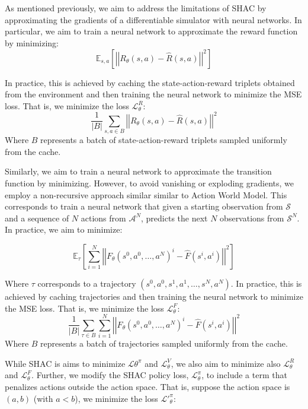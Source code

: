 \section{\fname{}}

As mentioned previously, we aim to address the limitations of SHAC by approximating the gradients of a differentiable simulator with neural networks. In particular, we aim to train a neural network to approximate the reward function by minimizing: 
$$ \mathbb{E}_{s,a}\left[\left|\left| R_{\theta}(s, a) - \hat{R}(s, a) \right|\right|^2\right] $$

In practice, this is achieved by caching the state-action-reward triplets obtained from the environment and then training the neural network to minimize the MSE loss. That is, we minimize the loss $\mathcal{L}_\theta^{R}$:
$$ \frac{1}{\left|B\right|}\sum_{s,a \in B}\left|\left| R_\theta(s, a) - \hat{R}(s, a) \right|\right|^2 $$
Where $B$ represents a batch of state-action-reward triplets sampled uniformly from the cache.

Similarly, we aim to train a neural network to approximate the transition function by minimizing. However, to avoid vanishing or exploding gradients, we employ a non-recursive approach similar similar to Action World Model\cite{Ma24}. This corresponds to train a neural network that given a starting observation from $\mathcal{S}$ and a sequence of $N$ actions from $\mathcal{A}^N$, predicts the next $N$ observations from $\mathcal{S}^N$. In practice, we aim to minimize:

$$ \mathbb{E}_{\tau}\left[\sum_{i=1}^N \left|\left| F_{\theta}(s^0, a^0, \dots, a^N)^i - \hat{F}(s^i, a^i) \right|\right|^2\right] $$

Where $\tau$ corresponds to a trajectory $(s^0, a^0, s^1, a^1, \dots, s^N, a^N)$. In practice, this is achieved by caching trajectories and then training the neural network to minimize the MSE loss. That is, we minimize the loss $\mathcal{L}_\theta^{F}$:
$$ \frac{1}{\left|B\right|}\sum_{\tau \in B}\sum_{i=1}^N\left|\left| F_{\theta}(s^0, a^0, \dots, a^N)^i - \hat{F}(s^i, a^i) \right|\right|^2 $$
Where $B$ represents a batch of trajectories sampled uniformly from the cache.

While SHAC is aims to minimize $\mathcal{L}\theta^\pi$ and $\mathcal{L}_\theta^V$, we also aim to minimize also $\mathcal{L}_\theta^R$ and $\mathcal{L}_\theta^F$. Further, we modify the SHAC policy loss, $\mathcal{L}_\theta^{\pi}$, to include a term that penalizes actions outside the action space. That is, suppose the action space is $(a,b)$ (with $a<b$), we minimize the loss $\mathcal{L'}_\theta^\pi:$

